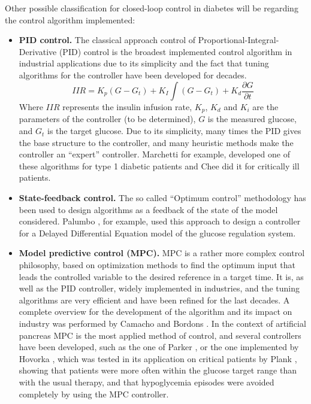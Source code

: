 Other possible classification for closed-loop control in diabetes will be regarding the control algorithm implemented:
\begin{itemize}
	\item \textbf{PID control.} The classical approach control of Proportional-Integral-Derivative (PID) control is the broadest implemented control algorithm in industrial applications due to its simplicity and the fact that tuning algorithms for the controller have been developed for decades.
	\begin{equation}\label{eq:PIDcontrol}
			IIR = K_{p}(G-G_{t}) + K_{I}\int(G-G_{t}) + K_{d}\frac{\partial G}{\partial t}
	\end{equation}
	Where $IIR$ represents the insulin infusion rate, $K_{p}$, $K_{d}$ and $K_{i}$  are the parameters of the controller (to be determined), $G$ is the measured glucose, and $G_{t}$ is the target glucose. Due to its simplicity, many times the PID gives the base structure to the controller, and many heuristic methods make the controller an ``expert'' controller. Marchetti \cite{marchetti2008improved} for example, developed one of these algorithms for type 1 diabetic patients and Chee \cite{chee2003expert} did it for critically ill patients.
	\item \textbf{State-feedback control.} The so called ``Optimum control'' methodology has been used to design algorithms as a feedback of the state of the model considered. Palumbo \cite{palumbo2008robust}, for example, used this approach to design a controller for a Delayed Differential Equation model of the glucose regulation system.
	\item \textbf{Model predictive control (MPC).} MPC is a rather more complex control philosophy, based on optimization methods to find the optimum input that leads the controlled variable to the desired reference in a target time. It is, as well as the PID controller, widely implemented in industries, and the tuning algorithms are very efficient and have been refined for the last decades. A complete overview for the development of the algorithm and its impact on industry was performed by Camacho and Bordons \cite{camacho2004model}. In the context of artificial pancreas MPC is the  most applied method of control, and several controllers have been developed, such as the one of Parker \cite{parker1999model}, or the one implemented by Hovorka \cite{hovorka2004nonlinear}, which was tested in its application on critical patients by Plank \cite{plank2006multicentric}, showing that patients were more often within the glucose target range than with the usual therapy, and that hypoglycemia episodes were avoided completely by using the MPC controller.
\end{itemize}
